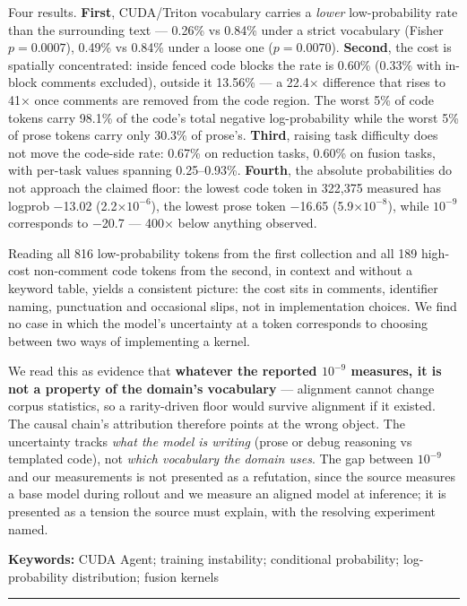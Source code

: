 \documentclass[
  11pt,
]{article}
\begin{document}
Four results. \textbf{First}, CUDA/Triton vocabulary carries a
\emph{lower} low-probability rate than the surrounding text --- 0.26\%
vs 0.84\% under a strict vocabulary (Fisher \(p = 0.0007\)), 0.49\% vs
0.84\% under a loose one (\(p = 0.0070\)). \textbf{Second}, the cost is
spatially concentrated: inside fenced code blocks the rate is 0.60\%
(0.33\% with in-block comments excluded), outside it 13.56\% --- a 22.4×
difference that rises to 41× once comments are removed from the code
region. The worst 5\% of code tokens carry 98.1\% of the code's total
negative log-probability while the worst 5\% of prose tokens carry only
30.3\% of prose's. \textbf{Third}, raising task difficulty does not move
the code-side rate: 0.67\% on reduction tasks, 0.60\% on fusion tasks,
with per-task values spanning 0.25--0.93\%. \textbf{Fourth}, the
absolute probabilities do not approach the claimed floor: the lowest
code token in 322,375 measured has logprob −13.02 (2.2×\(10^{-6}\)), the
lowest prose token −16.65 (5.9×\(10^{-8}\)), while \(10^{-9}\)
corresponds to −20.7 --- 400× below anything observed.

Reading all 816 low-probability tokens from the first collection and all
189 high-cost non-comment code tokens from the second, in context and
without a keyword table, yields a consistent picture: the cost sits in
comments, identifier naming, punctuation and occasional slips, not in
implementation choices. We find no case in which the model's uncertainty
at a token corresponds to choosing between two ways of implementing a
kernel.

We read this as evidence that \textbf{whatever the reported \(10^{-9}\)
measures, it is not a property of the domain's vocabulary} --- alignment
cannot change corpus statistics, so a rarity-driven floor would survive
alignment if it existed. The causal chain's attribution therefore points
at the wrong object. The uncertainty tracks \emph{what the model is
writing} (prose or debug reasoning vs templated code), not \emph{which
vocabulary the domain uses}. The gap between \(10^{-9}\) and our
measurements is not presented as a refutation, since the source measures
a base model during rollout and we measure an aligned model at
inference; it is presented as a tension the source must explain, with
the resolving experiment named.

\textbf{Keywords:} CUDA Agent; training instability; conditional
probability; log-probability distribution; fusion kernels

\begin{center}\rule{0.5\linewidth}{0.5pt}\end{center}
\end{document}
